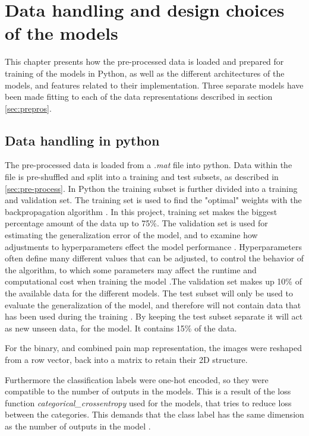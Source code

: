 \section{Data handling and design choices of the models}
This chapter presents how the pre-processed data is loaded and prepared for training of the models in Python, as well as the different architectures of the models, and features related to their implementation. Three separate models have been made fitting to each of the data representations described in section \ref{sec:prepros}. 

\subsection{Data handling in python}
The pre-processed data is loaded from a \textit{.mat} file into python.
Data within the file is pre-shuffled and split into a training and test subsets, as described in \autoref{sec:pre-process}. 
In Python the training subset is further divided into a training and validation set. 
The training set is used to find the "optimal" weights with the backpropagation algorithm \citep{Bengio2012}. In this project, training set makes the biggest percentage amount of the data up to 75\%.
The validation set is used for estimating the generalization error of the model, and to examine how adjustments to hyperparameters effect the model performance \citep{Duda2000}. Hyperparameters often define many different values that can be adjusted, to control the behavior of the algorithm, to which some parameters may affect the runtime and computational cost when training the model \citep{Goodfellow2016}.The validation set makes up 10\% of the available data for the different models.
The test subset will only be used to evaluate the generalization of the model, and therefore will not contain data that has been used during the training \citep{Duda2000}.
By keeping the test subset separate it will act as new unseen data, for the model. It contains 15\% of the data.

For the binary, and combined pain map representation, the images were reshaped from a row vector, back into a matrix to retain their 2D structure. 

Furthermore the classification labels were one-hot encoded, so they were compatible to the number of outputs in the models. This is a result of the loss function \textit{categorical\_crossentropy} used for the models, that tries to reduce loss between the categories. This demands that the class label has the same dimension as the number of outputs in the model \citep{Chollet2015}.    

